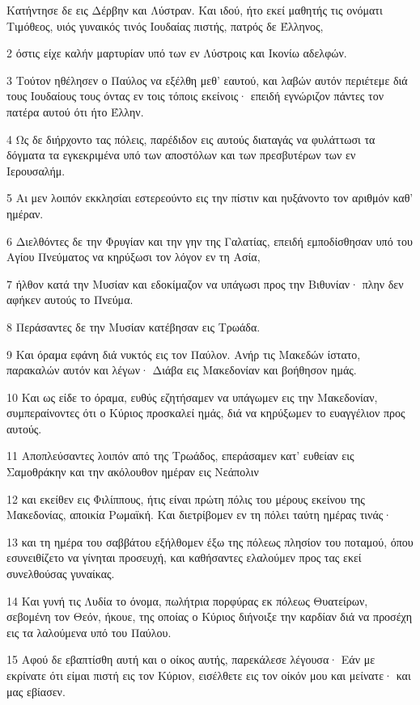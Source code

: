 \par Κατήντησε δε εις Δέρβην και Λύστραν. Και ιδού, ήτο εκεί μαθητής τις ονόματι Τιμόθεος, υιός γυναικός τινός Ιουδαίας πιστής, πατρός δε Έλληνος,
\par 2 όστις είχε καλήν μαρτυρίαν υπό των εν Λύστροις και Ικονίω αδελφών.
\par 3 Τούτον ηθέλησεν ο Παύλος να εξέλθη μεθ' εαυτού, και λαβών αυτόν περιέτεμε διά τους Ιουδαίους τους όντας εν τοις τόποις εκείνοις· επειδή εγνώριζον πάντες τον πατέρα αυτού ότι ήτο Έλλην.
\par 4 Ως δε διήρχοντο τας πόλεις, παρέδιδον εις αυτούς διαταγάς να φυλάττωσι τα δόγματα τα εγκεκριμένα υπό των αποστόλων και των πρεσβυτέρων των εν Ιερουσαλήμ.
\par 5 Αι μεν λοιπόν εκκλησίαι εστερεούντο εις την πίστιν και ηυξάνοντο τον αριθμόν καθ' ημέραν.
\par 6 Διελθόντες δε την Φρυγίαν και την γην της Γαλατίας, επειδή εμποδίσθησαν υπό του Αγίου Πνεύματος να κηρύξωσι τον λόγον εν τη Ασία,
\par 7 ήλθον κατά την Μυσίαν και εδοκίμαζον να υπάγωσι προς την Βιθυνίαν· πλην δεν αφήκεν αυτούς το Πνεύμα.
\par 8 Περάσαντες δε την Μυσίαν κατέβησαν εις Τρωάδα.
\par 9 Και όραμα εφάνη διά νυκτός εις τον Παύλον. Ανήρ τις Μακεδών ίστατο, παρακαλών αυτόν και λέγων· Διάβα εις Μακεδονίαν και βοήθησον ημάς.
\par 10 Και ως είδε το όραμα, ευθύς εζητήσαμεν να υπάγωμεν εις την Μακεδονίαν, συμπεραίνοντες ότι ο Κύριος προσκαλεί ημάς, διά να κηρύξωμεν το ευαγγέλιον προς αυτούς.
\par 11 Αποπλεύσαντες λοιπόν από της Τρωάδος, επεράσαμεν κατ' ευθείαν εις Σαμοθράκην και την ακόλουθον ημέραν εις Νεάπολιν
\par 12 και εκείθεν εις Φιλίππους, ήτις είναι πρώτη πόλις του μέρους εκείνου της Μακεδονίας, αποικία Ρωμαϊκή. Και διετρίβομεν εν τη πόλει ταύτη ημέρας τινάς·
\par 13 και τη ημέρα του σαββάτου εξήλθομεν έξω της πόλεως πλησίον του ποταμού, όπου εσυνειθίζετο να γίνηται προσευχή, και καθήσαντες ελαλούμεν προς τας εκεί συνελθούσας γυναίκας.
\par 14 Και γυνή τις Λυδία το όνομα, πωλήτρια πορφύρας εκ πόλεως Θυατείρων, σεβομένη τον Θεόν, ήκουε, της οποίας ο Κύριος διήνοιξε την καρδίαν διά να προσέχη εις τα λαλούμενα υπό του Παύλου.
\par 15 Αφού δε εβαπτίσθη αυτή και ο οίκος αυτής, παρεκάλεσε λέγουσα· Εάν με εκρίνατε ότι είμαι πιστή εις τον Κύριον, εισέλθετε εις τον οίκόν μου και μείνατε· και μας εβίασεν.
